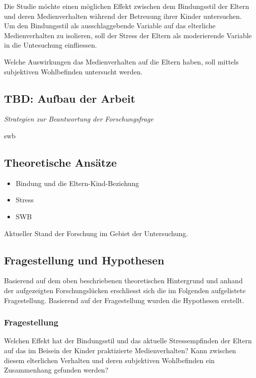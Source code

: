 Die Studie möchte einen möglichen Effekt zwischen dem Bindungsstil der Eltern und deren Medienverhalten während der Betreuung ihrer Kinder untersuchen. Um den Bindungsstil als ausschlaggebende Variable auf das elterliche Medienverhalten zu isolieren, soll der Stress der Eltern als moderierende Variable in die Untesuchung einfliessen.

Welche Auswirkungen das Medienverhalten auf die Eltern haben, soll mittels subjektiven Wohlbefinden  untersucht werden. 

\subsection{TBD: Aufbau der Arbeit} \label{sec:Aufbau}
\textit{Strategien zur Beantwortung der Forschungsfrage}

\gls{swb}


\subsection{Theoretische Ansätze}
\begin{itemize}
 \item Bindung und die Eltern-Kind-Beziehung 
 \item Stress
 \item SWB
\end{itemize}
Aktueller Stand der Forschung im Gebiet der Untersuchung.





\subsection{Fragestellung und Hypothesen} \label{sec:Fragestellung}
Basierend auf dem oben beschriebenen theoretischen Hintergrund und anhand der aufgezeigten Forschungslücken erschliesst sich die im Folgenden aufgelistete Fragestellung. Basierend auf der Fragestellung wurden die Hypothesen erstellt.
\subsubsection{Fragestellung} 
Welchen Effekt hat der Bindungsstil und das aktuelle Stressempfinden der Eltern auf das im Beisein der Kinder praktizierte Medienverhalten? Kann zwischen diesem elterlichen Verhalten und deren subjektiven Wohlbefinden ein Zusammenhang gefunden werden?
